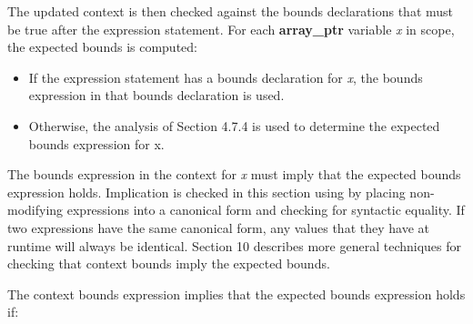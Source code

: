\documentclass[]{article}
\begin{document}
The updated context is then checked against the bounds declarations that
must be true after the expression statement. For each
\textbf{array\_ptr} variable \emph{x} in scope, the expected bounds is
computed:

\begin{itemize}
\item
  If the expression statement has a bounds declaration for \emph{x}, the
  bounds expression in that bounds declaration is used.
\item
  Otherwise, the analysis of Section 4.7.4 is used to determine the
  expected bounds expression for x.
\end{itemize}

The bounds expression in the context for \emph{x} must imply that the
expected bounds expression holds. Implication is checked in this section
using by placing non-modifying expressions into a canonical form and
checking for syntactic equality. If two expressions have the same
canonical form, any values that they have at runtime will always be
identical. Section 10 describes more general techniques for checking
that context bounds imply the expected bounds.

The context bounds expression implies that the expected bounds
expression holds if:
\end{document}
